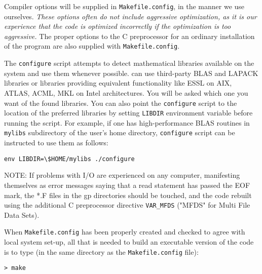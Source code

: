 Compiler options will be supplied in \verb|Makefile.config|, in the manner
we use ourselves. {\em These options often do not include aggressive
optimization, as
it is our experience that
the code is optimized incorrectly if the optimization is too
aggressive.} The proper options to the C preprocessor for an ordinary
installation of the program are also supplied with
\verb|Makefile.config|.

The \verb|configure| script attempts to detect mathematical libraries
available on the system and use them whenever possible. {\dalton} can
use third-party BLAS and LAPACK libraries or libraries providing
equivalent functionality like ESSL on AIX, ATLAS, ACML, MKL on Intel
architectures.
You will be asked which one you want of the found libraries.
You can also point the \verb|configure|
script to the location of the preferred libraries by setting
\verb|LIBDIR| environment variable before running the script. For
example, if one has high-performance BLAS routines in \verb|mylibs|
subdirectory of the user's home directory, \verb|configure| script can
be instructed to use them as follows:
\begin{verbatim}
env LIBDIR=\$HOME/mylibs ./configure
\end{verbatim}


NOTE: If problems with I/O are experienced on
any computer,
manifesting themselves as error messages saying that a read statement
has passed the EOF mark, the *.F files in the gp directories should be
touched, and the code rebuilt using the additional C preprocessor
directive \verb|VAR_MFDS| ("MFDS" for Multi File Data Sets).

When  \verb|Makefile.config| has been properly
created and checked
to agree with local system set-up, all that is needed
to build an executable version of the
code is to type
(in the same directory as the \verb|Makefile.config| file):
\begin{verbatim}
> make
\end{verbatim}

